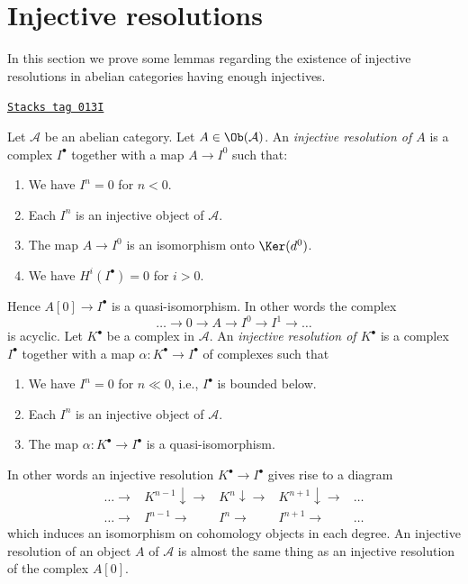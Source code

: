 \section{Injective resolutions}
\label{derived-section-injective-resolutions}
In this section we prove some lemmas regarding the existence
of injective resolutions in abelian categories having enough injectives.

\begin{definition}
\label{derived-definition-injective-resolution}
\href{https://stacks.math.columbia.edu/tag/013I}{\texttt{Stacks tag 013I}}

Let $\mathcal{A}$ be an abelian category.
Let $A \in \Ob(\mathcal{A})$.
An {\it injective resolution of $A$} is a complex
$I^\bullet$ together with a map $A \to I^0$ such
that:
\begin{enumerate}
\item We have $I^n = 0$ for $n < 0$.
\item Each $I^n$ is an injective object of $\mathcal{A}$.
\item The map $A \to I^0$ is an isomorphism onto $\Ker(d^0)$.
\item We have $H^i(I^\bullet) = 0$ for $i > 0$.
\end{enumerate}
Hence $A[0] \to I^\bullet$ is a quasi-isomorphism.
In other words the complex
$$
\ldots \to 0 \to A \to I^0 \to I^1 \to \ldots
$$
is acyclic.
Let $K^\bullet$ be a complex in $\mathcal{A}$.
An {\it injective resolution of $K^\bullet$} is a complex
$I^\bullet$ together with a map $\alpha : K^\bullet \to I^\bullet$
of complexes such that
\begin{enumerate}
\item We have $I^n = 0$ for $n \ll 0$, i.e., $I^\bullet$ is bounded below.
\item Each $I^n$ is an injective object of $\mathcal{A}$.
\item The map $\alpha : K^\bullet \to I^\bullet$ is a
quasi-isomorphism.
\end{enumerate}
\end{definition}

In other words an injective resolution $K^\bullet \to I^\bullet$
gives rise to a diagram
$$
\begin{array}{ccccc}\ldots \longrightarrow & K^{n - 1} \downarrow\longrightarrow & K^n \downarrow\longrightarrow & K^{n + 1} \downarrow\longrightarrow & \ldots \\ \ldots \longrightarrow & I^{n - 1} \longrightarrow & I^n \longrightarrow & I^{n + 1} \longrightarrow & \ldots\end{array}
$$
which induces an isomorphism on cohomology objects in each degree.
An injective resolution of an object $A$ of $\mathcal{A}$
is almost the same thing as an injective resolution of
the complex $A[0]$.

